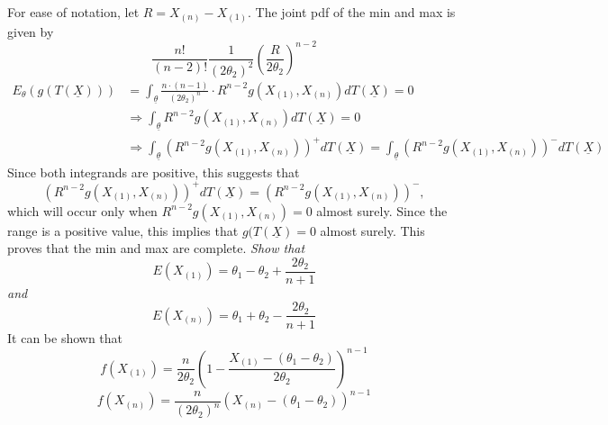 \documentclass[12pt]{report}
\begin{document}
For ease of notation, let $R = X_{(n)} - X_{(1)}$. The joint pdf of the min and max is given by
\[ \frac{n!}{(n-2)!} \frac{1}{\left( 2 \theta_2 \right)^2} \left( \frac{R}{2 \theta_2} \right) ^{n-2} \]
\begin{align*}
E_\theta(g(T(\underline{X}))) &= \int_{\underline{\theta}} \frac{n \cdot (n-1)}{\left( 2 \theta_2 \right)^n } \cdot R^{n-2} g(X_{(1)}, X_{(n)}) dT(\underline{X}) = 0 \\
& \Rightarrow  \int_{\underline{\theta}} R^{n-2} g(X_{(1)}, X_{(n)}) dT(\underline{X}) = 0 \\
& \Rightarrow  \int_{\underline{\theta}} \left( R^{n-2} g(X_{(1)}, X_{(n)}) \right)^+ dT(\underline{X}) = \int_{\underline{\theta}} \left( R^{n-2} g(X_{(1)}, X_{(n)}) \right)^- dT(\underline{X})
\end{align*}
Since both integrands are positive, this suggests that 
\[ \left( R^{n-2} g(X_{(1)}, X_{(n)}) \right)^+ dT(\underline{X}) = \left( R^{n-2} g(X_{(1)}, X_{(n)}) \right)^-, \]
which will occur only when $R^{n-2} g(X_{(1)}, X_{(n)}) = 0$ almost surely. Since the range is a positive value, this implies that $g(T(\underline{X}) = 0$ almost surely. This proves that the min and max are complete. 
\newline
\newline
\emph{Show that 
\[ E(X_{(1)}) = \theta_1 - \theta_2 + \frac{2 \theta_2}{n+1} \] and 
\[ E(X_{(n)}) = \theta_1 + \theta_2 - \frac{2 \theta_2}{n+1} \] }
It can be shown that
\[ f(X_{(1)}) = \frac{n}{ 2 \theta_2 } \left( 1 - \frac{X_{(1)} - (\theta_1-\theta_2)}{2 \theta_2} \right)^{n-1} \]
\[ f(X_{(n)}) = \frac{n}{\left( 2 \theta_2 \right)^n} \left( X_{(n)} - (\theta_1 - \theta_2) \right)^{n-1} \]
\end{document}
